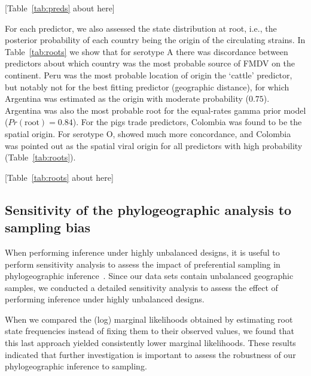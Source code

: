 \documentclass[10pt]{article}
\begin{document}
\begin{center}
 [Table~\ref{tab:preds} about here]
\end{center}

For each predictor, we also assessed the state distribution at root, i.e., the posterior probability of each country being the origin of the circulating strains.
In Table~\ref{tab:roots} we show that for serotype A there was discordance between predictors about which country was the most probable source of FMDV on the continent.
Peru was the most probable location of origin the `cattle' predictor, but notably not for the best fitting predictor (geographic distance), for which Argentina was estimated as the origin with moderate probability ($0.75$).
Argentina was also the most probable root for the equal-rates gamma prior model ($Pr(\text{root})=0.84$).
For the pigs trade predictors, Colombia was found to be the spatial origin.
For serotype O, showed much more concordance, and Colombia was pointed out as the spatial viral origin for all predictors with high probability (Table~\ref{tab:roots}).


\begin{center}
 [Table~\ref{tab:roots} about here]
\end{center}

\subsection*{Sensitivity of the phylogeographic analysis to sampling bias}

When performing inference under highly unbalanced designs, it is useful to perform sensitivity analysis to assess the impact of preferential sampling in phylogeographic inference~\cite{Faria2012,polar,fluPNAS}. 
Since our data sets contain unbalanced geographic samples, we conducted a detailed sensitivity analysis to assess the effect of performing inference under highly unbalanced designs.

When we compared the (log) marginal likelihoods obtained by estimating root state frequencies instead of fixing them to their observed values, we found that this last approach yielded consistently lower marginal likelihoods.
These results indicated that further investigation is important to assess the robustness of our phylogeographic inference to sampling. %
\end{document}
